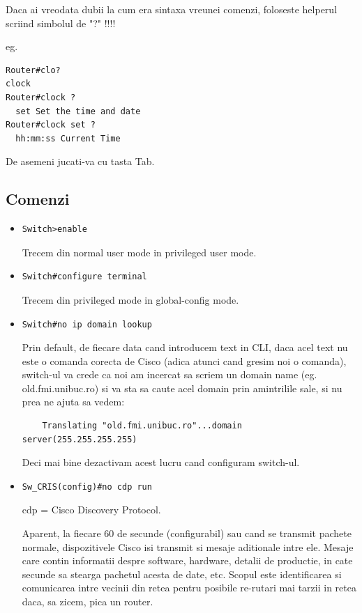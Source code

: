 \documentclass{article}
\begin{document}
Daca ai vreodata dubii la cum era sintaxa vreunei comenzi, foloseste helperul scriind simbolul de "?" !!!!

eg.
\begin{verbatim}
Router#clo?
clock
Router#clock ?
  set Set the time and date
Router#clock set ?
  hh:mm:ss Current Time
\end{verbatim}

De asemeni jucati-va cu tasta Tab.

\subsection{Comenzi}

\begin{itemize}

\item 
\begin{verbatim}
Switch>enable
\end{verbatim}
Trecem din normal user mode in privileged user mode. 

\item
\begin{verbatim}
Switch#configure terminal
\end{verbatim}
Trecem din privileged mode in global-config mode.

\item
\begin{verbatim}
Switch#no ip domain lookup
\end{verbatim}
Prin default, de fiecare data cand introducem text in CLI, daca acel text nu este o comanda corecta de Cisco (adica atunci cand gresim noi o comanda), switch-ul va crede ca noi am incercat sa scriem un domain name (eg. old.fmi.unibuc.ro) si va sta sa caute acel domain prin amintrilile sale, si nu prea ne ajuta sa vedem:
\begin{verbatim}
    Translating "old.fmi.unibuc.ro"...domain server(255.255.255.255)
\end{verbatim}
Deci mai bine dezactivam acest lucru cand configuram switch-ul. 

\item 
\begin{verbatim}
Sw_CRIS(config)#no cdp run
\end{verbatim}
cdp = Cisco Discovery Protocol. 

Aparent, la fiecare 60 de secunde (configurabil) sau cand se transmit pachete normale, dispozitivele Cisco isi transmit si mesaje aditionale intre ele. Mesaje care contin informatii despre software, hardware, detalii de productie, in cate secunde sa stearga pachetul acesta de date, etc. Scopul este identificarea si comunicarea intre vecinii din retea pentru posibile re-rutari mai tarzii in retea daca, sa zicem, pica un router. 


\end{itemize}
\end{document}
